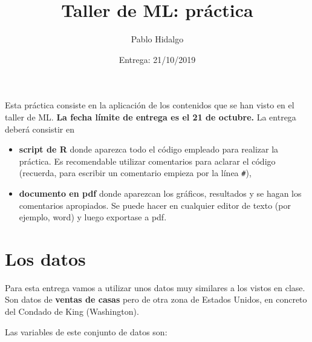 \documentclass[]{article}
\title{Taller de ML: práctica}
\author{Pablo Hidalgo}
\date{Entrega: 21/10/2019}
\providecommand{\tightlist}{%
  \setlength{\itemsep}{0pt}\setlength{\parskip}{0pt}}
\begin{document}
\maketitle

Esta práctica consiste en la aplicación de los contenidos que se han
visto en el taller de ML. \textbf{La fecha límite de entrega es el 21 de
octubre.} La entrega deberá consistir en

\begin{itemize}
\tightlist
\item
  \textbf{script de R} donde aparezca todo el código empleado para
  realizar la práctica. Es recomendable utilizar comentarios para
  aclarar el código (recuerda, para escribir un comentario empieza por
  la línea \texttt{\#}),
\item
  \textbf{documento en pdf} donde aparezcan los gráficos, resultados y
  se hagan los comentarios apropiados. Se puede hacer en cualquier
  editor de texto (por ejemplo, word) y luego exportase a pdf.
\end{itemize}

\hypertarget{los-datos}{%
\section{Los datos}\label{los-datos}}

Para esta entrega vamos a utilizar unos datos muy similares a los vistos
en clase. Son datos de \textbf{ventas de casas} pero de otra zona de
Estados Unidos, en concreto del Condado de King (Washington).

Las variables de este conjunto de datos son:
\end{document}
